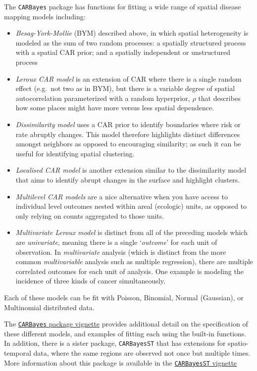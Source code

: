 \documentclass[
]{book}
\providecommand{\tightlist}{%
  \setlength{\itemsep}{0pt}\setlength{\parskip}{0pt}}
\begin{document}
The \texttt{CARBayes} package has functions for fitting a wide range of spatial disease mapping models including:

\begin{itemize}
\tightlist
\item
  \emph{Besag-York-Mollie} (BYM) described above, in which spatial heterogeneity is modeled as the sum of two random processes: a spatially structured process with a spatial CAR prior; and a spatially independent or unstructured process
\item
  \emph{Leroux CAR model} is an extension of CAR where there is a single random effect (e.g.~not two as in BYM), but there is a variable degree of spatial autocorrelation parameterized with a random hyperprior, \(\rho\) that describes how some places might have more versus less spatial dependence.
\item
  \emph{Dissimilarity model} uses a CAR prior to identify boundaries where risk or rate abruptly changes. This model therefore highlights distinct differences amongst neighbors as opposed to encouraging similarity; as such it can be useful for identifying spatial clustering.
\item
  \emph{Localised CAR model} is another extension similar to the dissimilarity model that aims to identify abrupt changes in the surface and highlight clusters.
\item
  \emph{Multilevel CAR models} are a nice alternative when you have access to individual level outcomes nested within areal (ecologic) units, as opposed to only relying on counts aggregated to those units.
\item
  \emph{Multivariate Leroux model} is distinct from all of the preceding models which are \emph{univariate}, meaning there is a single `\emph{outcome}' for each unit of observation. In \emph{multivariate} analysis (which is distinct from the more common \emph{multivariable} analysis such as multiple regression), there are multiple correlated outcomes for each unit of analysis. One example is modeling the incidence of three kinds of cancer simultaneously.
\end{itemize}

Each of these models can be fit with Poisson, Binomial, Normal (Gaussian), or Multinomial distributed data.

The \href{https://cran.r-project.org/web/packages/CARBayes/vignettes/CARBayes.pdf}{\texttt{CARBayes} package vignette} provides additional detail on the specification of these different models, and examples of fitting each using the built-in functions. In addition, there is a sister package, \texttt{CARBayesST} that has extensions for spatio-temporal data, where the same regions are observed not once but multiple times. More information about this package is available in the \href{https://cran.r-project.org/web/packages/CARBayesST/vignettes/CARBayesST.pdf}{\texttt{CARBayesST} vignette}
\end{document}
